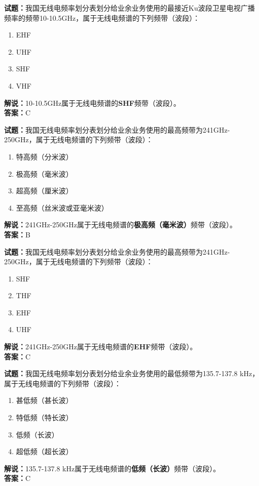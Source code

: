 \documentclass{ctexbook}
\begin{document}
\bigskip

\noindent\textbf{试题：}我国无线电频率划分表划分给业余业务使用的最接近Ku波段卫星电视广播频率的频带10-10.5\unit{\GHz}，属于无线电频谱的下列频带（波段）：
\begin{enumerate}[leftmargin=3em]
  \item EHF
  \item UHF
  \item SHF
  \item VHF
\end{enumerate}
\noindent\textbf{解说：}10-10.5\unit{\GHz}属于无线电频谱的\textbf{SHF}频带（波段）。\\\noindent\textbf{答案：}C

\bigskip

\noindent\textbf{试题：}我国无线电频率划分表划分给业余业务使用的最高频带为241\unit{\GHz}-250\unit{\GHz}，属于无线电频谱的下列频带（波段）：
\begin{enumerate}[leftmargin=3em]
  \item 特高频（分米波）
  \item 极高频（毫米波）
  \item 超高频（厘米波）
  \item 至高频（丝米波或亚毫米波）
\end{enumerate}
\noindent\textbf{解说：}241\unit{\GHz}-250\unit{\GHz}属于无线电频谱的\textbf{极高频（毫米波）}频带（波段）。\\\noindent\textbf{答案：}B

\bigskip

\noindent\textbf{试题：}我国无线电频率划分表划分给业余业务使用的最高频带为241\unit{\GHz}-250\unit{\GHz}，属于无线电频谱的下列频带（波段）：
\begin{enumerate}[leftmargin=3em]
  \item SHF
  \item THF
  \item EHF
  \item UHF
\end{enumerate}
\noindent\textbf{解说：}241\unit{\GHz}-250\unit{\GHz}属于无线电频谱的\textbf{EHF}频带（波段）。\\\noindent\textbf{答案：}C

\bigskip

\noindent\textbf{试题：}我国无线电频率划分表划分给业余业务使用的最低频带为135.7-137.8 \unit{\kHz}，属于无线电频谱的下列频带（波段）：
\begin{enumerate}[leftmargin=3em]
  \item 甚低频（甚长波）
  \item 特低频（特长波）
  \item 低频（长波）
  \item 超低频（超长波）
\end{enumerate}
\noindent\textbf{解说：}135.7-137.8 \unit{\kHz}属于无线电频谱的\textbf{低频（长波）}频带（波段）。\\\noindent\textbf{答案：}C
\end{document}
